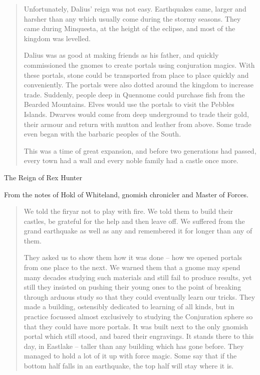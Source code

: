 \begin{multicols}{2}
\begin{quotation}
	Unfortunately, Dalius' reign was not easy.
	Earthquakes came, larger and harsher than any which usually come during the stormy seasons.
	They came during Minquesta, at the height of the eclipse, and most of the kingdom was levelled.

	Dalius was as good at making friends as his father, and quickly commissioned the gnomes to create portals using conjuration magics.
	With these portals, stone could be transported from place to place quickly and conveniently.
	The portals were also dotted around the kingdom to increase trade.
	Suddenly, people deep in Quennome could purchase fish from the Bearded Mountains.
	Elves would use the portals to visit the Pebbles Islands.
	Dwarves would come from deep underground to trade their gold, their armour and return with mutton and leather from above.
	Some trade even began with the barbaric peoples of the South.

	This was a time of great expansion, and before two generations had passed, every town had a wall and every noble family had a castle once more.

\end{quotation}

The Reign of Rex Hunter\label{r_hunter}

From the notes of Hokl of Whiteland, gnomish chronicler and Master of Forces.

\begin{quotation}

	We told the firyar not to play with fire.
	We told them to build their castles, be grateful for the help and then leave off.
	We suffered from the grand earthquake as well as any and remembered it for longer than any of them.  

	They asked us to show them how it was done -- how we opened portals from one place to the next.
	We warned them that a gnome may spend many decades studying such materials and still fail to produce results, yet still they insisted on pushing their young ones to the point of breaking through arduous study so that they could eventually learn our tricks.
	They made a building, ostensibly dedicated to learning of all kinds, but in practice focussed almost exclusively to studying the Conjuration sphere so that they could have more portals.
	It was built next to the only gnomish portal which still stood, and bared their engravings.
	It stands there to this day, in Eastlake -- taller than any building which has gone before.
	They managed to hold a lot of it up with force magic.
	Some say that if the bottom half falls in an earthquake, the top half will stay where it is.


\end{quotation}
\end{multicols}
